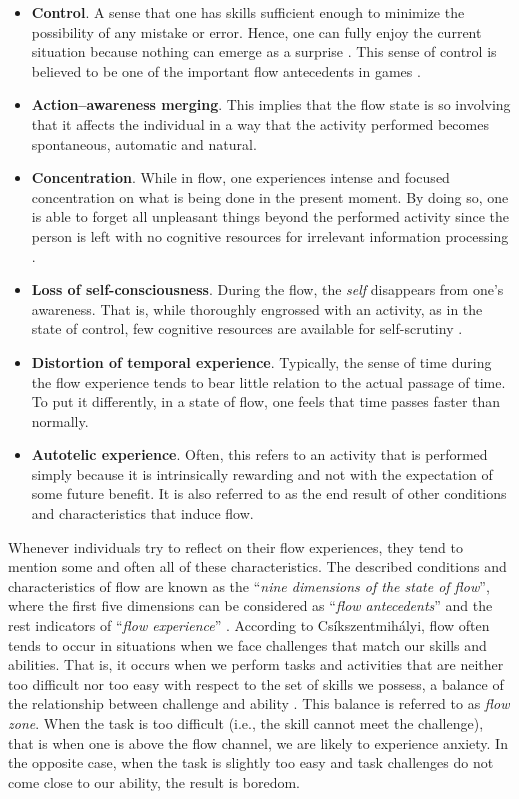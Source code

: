 \begin{itemize}
\item \textbf{Control}. A sense that one has skills sufficient enough to minimize the possibility of any mistake or error. Hence, one can fully enjoy the current situation because nothing can emerge as a surprise
\cite{csikszentmihalyi2014flow}. This sense of control is believed to be one of the important flow antecedents in games \cite{kiili2006evaluations}. 
\item \textbf{Action–awareness merging}. This implies that the flow state is so involving that it affects the individual in a way that the activity performed becomes spontaneous, automatic and natural.
\item \textbf{Concentration}. While in flow, one experiences intense and focused concentration on what is being done in the present moment. By doing so, one is able to forget all unpleasant things beyond the performed activity since the person is left with no cognitive resources for irrelevant information processing \cite{kiili2006evaluations}. 
\item \textbf{Loss of self-consciousness}. During the flow, the \textit{self} disappears from one's awareness. That is, while thoroughly engrossed with an activity, as in the state of control, few cognitive resources are
available for self-scrutiny \cite{kiili2006evaluations}.
\item \textbf{Distortion of temporal experience}. Typically, the sense of time during the flow experience tends to bear little relation to the actual passage of time. To put it differently, in a state of flow, one feels that time passes faster than normally.
\item \textbf{Autotelic experience}. Often, this refers to an activity that is performed simply because it is intrinsically rewarding and not with the expectation of some future benefit. It is also referred to as the end result of other conditions and characteristics that induce flow. 
\end{itemize}
Whenever individuals try to reflect on their flow experiences, they tend to mention some and often all of these characteristics. The described conditions and characteristics of flow are known as the ``\textit{nine dimensions of the state of flow}'', where the first five dimensions can be considered as ``\textit{flow antecedents}'' and the rest indicators of ``\textit{flow experience}'' \cite{kiili2006evaluations}. According to Cs\'{i}kszentmih\'{a}lyi, flow often tends to occur in situations when we face challenges that match our skills and abilities. That is, it occurs when we perform tasks and activities that are neither too difficult nor too easy with respect to the set of skills we possess, a balance of the relationship between challenge and ability \cite{csikszentmihalyi1996flow, csikszentmihalyi1997finding, flow1990psychology}. This balance is referred to as \textit{flow zone}. When the task is too difficult (i.e., the skill cannot meet the challenge), that is when one is above the flow channel, we are likely to experience anxiety. In the opposite case, when the task is slightly too easy and task challenges do not come close to our ability, the result is boredom.
